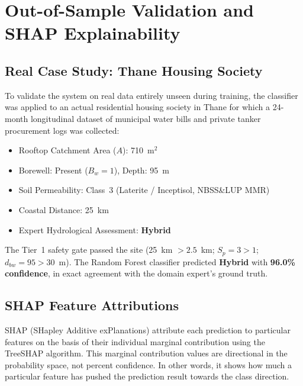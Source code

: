 \documentclass[conference]{IEEEtran}
\begin{document}

\section{Out-of-Sample Validation and SHAP Explainability}
\label{sec:shap}

\subsection{Real Case Study: Thane Housing Society}

To validate the system on real data entirely unseen during training, the
classifier was applied to an actual residential housing society in Thane for
which a 24-month longitudinal dataset of municipal water bills and private
tanker procurement logs was collected:
\begin{itemize}
  \item Rooftop Catchment Area ($A$): 710~m$^2$
  \item Borewell: Present ($B_w = 1$), Depth: 95~m
  \item Soil Permeability: Class~3 (Laterite / Inceptisol, NBSS\&LUP MMR)
  \item Coastal Distance: 25~km
  \item Expert Hydrological Assessment: \textbf{Hybrid}
\end{itemize}

The Tier~1 safety gate passed the site (25~km $> 2.5$~km; $S_p = 3 > 1$;
$d_{bw} = 95 > 30$~m). The Random Forest classifier predicted
\textbf{Hybrid} with \textbf{96.0\% confidence}, in exact agreement with
the domain expert's ground truth.

\subsection{SHAP Feature Attributions}

SHAP (SHapley Additive exPlanations) attribute each
prediction to particular features on the basis of their individual
marginal contribution using the TreeSHAP algorithm. This marginal
contribution values are directional in the probability space, not percent
confidence. In other words, it shows how much a particular feature has
pushed the prediction result towards the class direction.
\end{document}
